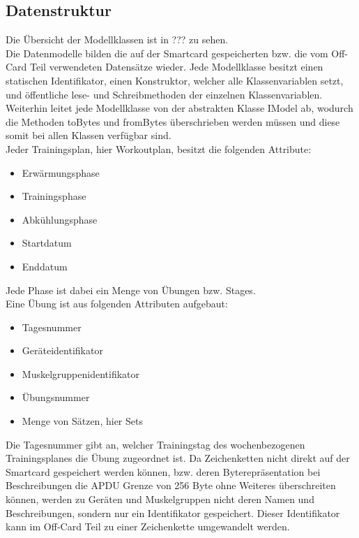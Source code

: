 \subsection{Datenstruktur}
\label{subsec:3.1}
Die Übersicht der Modellklassen ist in ??? zu sehen.
\\

Die Datenmodelle bilden die auf der Smartcard gespeicherten bzw. die vom Off-Card Teil verwendeten Datensätze wieder.
Jede Modellklasse besitzt einen statischen Identifikator, einen Konstruktor, welcher alle Klassenvariablen setzt, und öffentliche lese- und Schreibmethoden der einzelnen Klassenvariablen.
Weiterhin leitet jede Modellklasse von der abstrakten Klasse IModel ab, wodurch die Methoden toBytes und fromBytes überschrieben werden müssen und diese somit bei allen Klassen verfügbar sind.
\\

Jeder Trainingsplan, hier Workoutplan, besitzt die folgenden Attribute:
\begin{itemize}
\item Erwärmungsphase
\item Trainingsphase
\item Abkühlungsphase
\item Startdatum
\item Enddatum
\end{itemize}
Jede Phase ist dabei ein Menge von Übungen bzw. Stages.
\\

Eine Übung ist aus folgenden Attributen aufgebaut:
\begin{itemize}
\item Tagesnummer
\item Geräteidentifikator
\item Muskelgruppenidentifikator
\item Übungsnummer
\item Menge von Sätzen, hier Sets
\end{itemize}
Die Tagesnummer gibt an, welcher Trainingstag des wochenbezogenen Trainingsplanes die Übung zugeordnet ist.
Da Zeichenketten nicht direkt auf der Smartcard gespeichert werden können, bzw. deren Byterepräsentation bei Beschreibungen die APDU Grenze von 256 Byte ohne Weiteres überschreiten können, werden zu Geräten und Muskelgruppen nicht deren Namen und Beschreibungen, sondern nur ein Identifikator gespeichert. Dieser Identifikator kann im Off-Card Teil zu einer Zeichenkette umgewandelt werden.
\\

